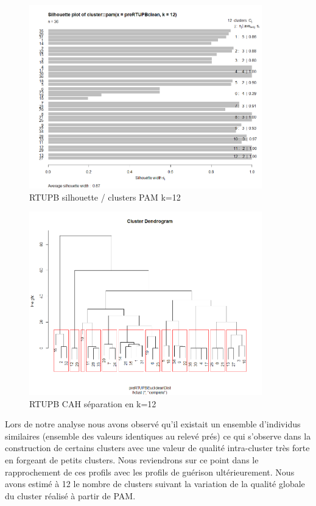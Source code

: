 \begin{figure}[H]
\centering
\includegraphics[width=0.90\textwidth]{../Fig/RTUPB/rtupb-sil-k12-pre.png}
\caption{RTUPB silhouette / clusters PAM k=12 }
\end{figure}

\begin{figure}[H]
\centering
\includegraphics[width=0.90\textwidth]{../Fig/RTUPB/rtupb-cah-k12-pre.png}
\caption{RTUPB CAH séparation en k=12 }
\end{figure}


%
%

Lors de notre analyse nous avons observé qu'il existait un ensemble d'individus similaires (ensemble des valeurs
identiques au relevé prés) ce qui s'observe dans la construction de certains clusters avec une valeur de qualité 
intra-cluster très forte en forgeant de petits clusters. Nous reviendrons sur ce point dans le rapprochement de ces
profils avec les profils de guérison ultérieurement. Nous avons estimé à 12 le nombre de clusters suivant la variation 
de la qualité globale  du cluster réalisé à partir de PAM. 

